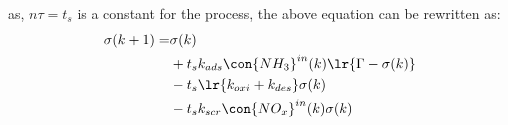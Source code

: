 as, $n\tau = t_s$ is a constant for the process, the above equation can be rewritten as:
\begin{align*}
    \sigma(k + 1) =& \sigma(k)\\
        &+ t_s k_{ads} \con{NH_3}^{in} (k) \lr{\Gamma - \sigma(k)} \\
        &- t_s \lr{k_{oxi} + k_{des}} \sigma(k)\\
        &- t_s k_{scr} \con{NO_x}^{in}(k) \sigma(k)
\end{align*}
